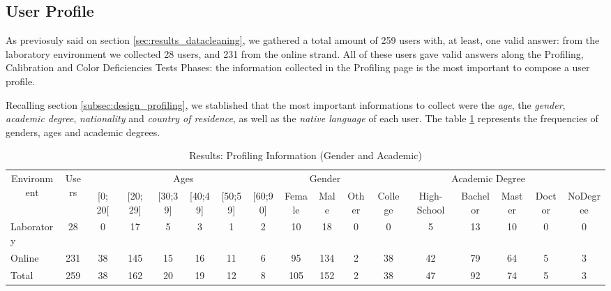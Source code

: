 \subsection{User Profile}
\label{subsec:results_userprofile}
%
As previosuly said on section \ref{sec:results_datacleaning}, we gathered a total amount of 259 users with, at least, one valid answer: from the laboratory environment
we collected 28 users, and 231 from the online strand. All of these users gave valid answers along the Profiling, Calibration and Color Deficiencies Tests Phases: the information collected
in the Profiling page is the most important to compose a user profile. \par
Recalling section \ref{subsec:design_profiling}, we stablished that the most important informations to collect were the \emph{age}, the \emph{gender}, \emph{academic degree},
\emph{nationality} and \emph{country of residence}, as well as the \emph{native language} of each user. The table \ref{table:profiling_genderacademic} represents the frequencies of genders, ages and
academic degrees. \par
%
\begin{table}[htbp]
  \resizebox{\textwidth}{!} {
    \begin{tabular}{| l || c || c | c | c | c | c | c || c | c | c || c | c | c | c | c | c |}
      \hline
      \multicolumn{1}{|c||}{\multirow{2}{*}{Environment}} & \multirow{2}{*}{Users} & \multicolumn{6}{c||}{Ages}                                                           & \multicolumn{3}{c||}{Gender} & \multicolumn{6}{c|}{Academic Degree}                          \\ \cline{3-17}
      \multicolumn{1}{|c||}{}                             &                        & {[}0; 20{[} & {[}20; 29{]} & {[}30;39{]} & {[}40;49{]} & {[}50;59{]} & {[}60;90{]} & Female   & Male   & Other   & College & High-School & Bachelor & Master & Doctor & NoDegree \\ \hline
      Laboratory                                         & 28                     & 0           & 17           & 5           & 3           & 1           & 2            & 10       & 18     & 0        & 0       & 5           & 13       & 10     & 0      & 0        \\ \hline
      Online                                             & 231                    & 38          & 145          & 15          & 16          & 11          & 6            & 95       & 134    & 2        & 38      & 42          & 79       & 64     & 5      & 3        \\ \hline \hline
      Total                                              & 259                    & 38          & 162          & 20          & 19          & 12          & 8            & 105      & 152    & 2        & 38      & 47          & 92       & 74     & 5      & 3        \\ \hline
    \end{tabular}}
  \caption[Results: Profiling Information (Gender and Academic)]{Results: Profiling Information (Gender and Academic)}
  \label{table:profiling_genderacademic}
\end{table}
